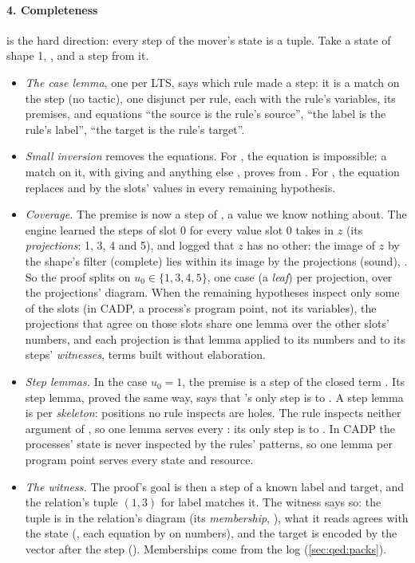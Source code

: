 \paragraph{4. Completeness} is the hard direction: every step of the
mover's state is a tuple. Take a state of shape 1,
, and a step  from it.
\begin{itemize}
\item \emph{The case lemma}, one per LTS, says which rule made a step:
  it is a match on the step (no tactic), one disjunct per rule, each with
  the rule's variables, its premises, and equations ``the source is the
  rule's source'', ``the label is the rule's label'', ``the target is
  the rule's target''.
\item \emph{Small inversion} \citep{monin-shi13} removes the equations. For , the
  equation  is impossible: a match
  on it, with  giving  and anything else
  , proves  from . For ,
  the equation  replaces 
  and  by the slots' values in every remaining hypothesis.
\item \emph{Coverage.} The premise is now a step of , a
  value we know nothing about. The engine learned the steps of slot 0
  for every value slot 0 takes in $z$ (its \emph{projections}: 1, 3, 4
  and 5), and logged that $z$ has no other: the image of $z$ by the
  shape's filter (complete) lies within its image by the projections
  (sound), . So the proof splits on $u_0 \in \{1, 3,
  4, 5\}$, one case (a \emph{leaf}) per projection,  over the
  projections' diagram. When the remaining hypotheses inspect only some
  of the slots (in CADP, a process's program point, not its variables),
  the projections that agree on those slots share one lemma over the
  other slots' numbers, and each projection is that lemma applied to its
  numbers and to its steps' \emph{witnesses}, terms built without
  elaboration.
\item \emph{Step lemmas.} In the case $u_0 = 1$, the premise is a step of
  the closed term . Its step lemma, proved the same way, says
  that 's only step is  to . A step lemma is per \emph{skeleton}: positions no rule
  inspects are holes. The rule  inspects neither argument of
  , so one lemma serves every : its only step is
   to . In CADP the processes' state is never inspected
  by the rules' patterns, so one lemma per program point serves every
  state and resource.
\item \emph{The witness.} The proof's goal is then a step of a known
  label and target, and the relation's tuple $(1, 3)$ for label
   matches it. The witness says so: the tuple is in the
  relation's diagram (its \emph{membership}, ), what it
  reads agrees with the state (, each equation by
   on numbers), and the target is encoded by the vector
  after the step (). Memberships come from the log
  (\cref{sec:qed:packs}).
\end{itemize}
